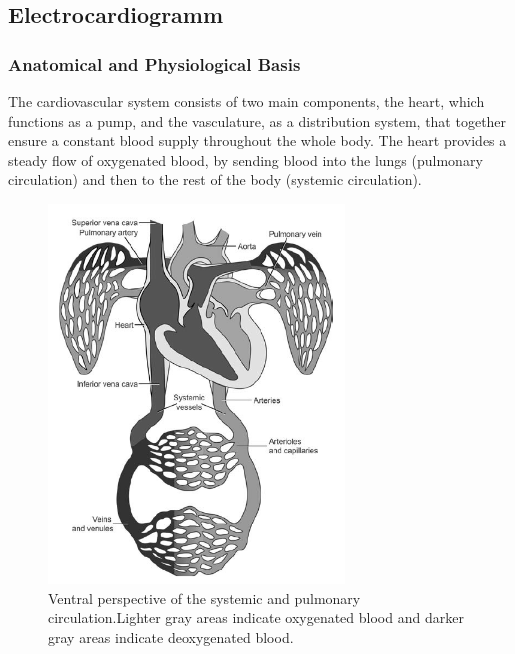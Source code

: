 \subsection{Electrocardiogramm}

\subsubsection{Anatomical and Physiological Basis}
The cardiovascular system consists of two main components, the heart, which functions as a pump, and the vasculature, as a distribution system, that together ensure a constant blood supply throughout the whole body. The heart provides a steady flow of oxygenated blood, by sending blood into the lungs (pulmonary circulation) and then to the rest of the body (systemic circulation).

\begin{figure}[ht]
\centering
\includegraphics[width=0.7\textwidth]{images/CVS.png}
\caption{Ventral perspective of the systemic and pulmonary circulation.Lighter gray areas indicate oxygenated blood and darker gray areas indicate deoxygenated blood.\citep{HANDBOOKPP}}
\label{CVSImg}
\end{figure}


